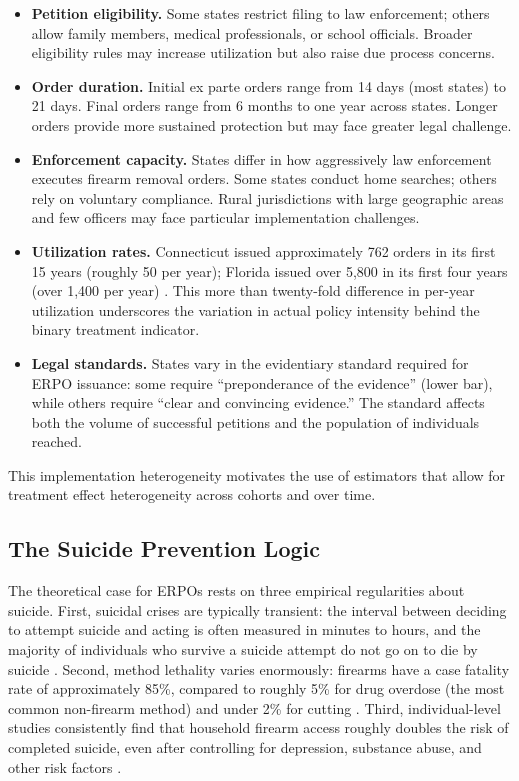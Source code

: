 \documentclass[12pt]{article}
\begin{document}
\begin{itemize}
\item \textbf{Petition eligibility.} Some states restrict filing to law enforcement; others allow family members, medical professionals, or school officials. Broader eligibility rules may increase utilization but also raise due process concerns.
\item \textbf{Order duration.} Initial ex parte orders range from 14 days (most states) to 21 days. Final orders range from 6 months to one year across states. Longer orders provide more sustained protection but may face greater legal challenge.
\item \textbf{Enforcement capacity.} States differ in how aggressively law enforcement executes firearm removal orders. Some states conduct home searches; others rely on voluntary compliance. Rural jurisdictions with large geographic areas and few officers may face particular implementation challenges.
\item \textbf{Utilization rates.} Connecticut issued approximately 762 orders in its first 15 years (roughly 50 per year); Florida issued over 5,800 in its first four years (over 1,400 per year) \citep{wintemute2019extreme}. This more than twenty-fold difference in per-year utilization underscores the variation in actual policy intensity behind the binary treatment indicator.
\item \textbf{Legal standards.} States vary in the evidentiary standard required for ERPO issuance: some require ``preponderance of the evidence'' (lower bar), while others require ``clear and convincing evidence.'' The standard affects both the volume of successful petitions and the population of individuals reached.
\end{itemize}

This implementation heterogeneity motivates the use of estimators that allow for treatment effect heterogeneity across cohorts and over time.

\subsection{The Suicide Prevention Logic}

The theoretical case for ERPOs rests on three empirical regularities about suicide. First, suicidal crises are typically transient: the interval between deciding to attempt suicide and acting is often measured in minutes to hours, and the majority of individuals who survive a suicide attempt do not go on to die by suicide \citep{owens2002fatal}. Second, method lethality varies enormously: firearms have a case fatality rate of approximately 85\%, compared to roughly 5\% for drug overdose (the most common non-firearm method) and under 2\% for cutting \citep{spicer2000suicide}. Third, individual-level studies consistently find that household firearm access roughly doubles the risk of completed suicide, even after controlling for depression, substance abuse, and other risk factors \citep{anglemyer2014accessibility, kellermann1992suicide}.
\end{document}
